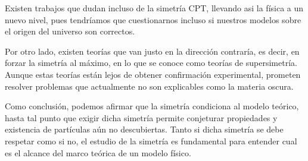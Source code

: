 Existen trabajos que dudan incluso de la simetría CPT, llevando asi la física a un nuevo nivel, pues tendríamos que cuestionarnos incluso si nuestros modelos sobre el origen del universo son correctos.

Por otro lado, existen teorías que van justo en la dirección contraría, es decir, en forzar la simetría al máximo, en lo que se conoce como teorías de supersimetría.
Aunque estas teorías están lejos de obtener confirmación experimental, prometen resolver problemas que actualmente no son explicables como la materia oscura.

Como conclusión, podemos afirmar que la simetría condiciona al modelo teórico, hasta tal punto que exigir dicha simetría permite conjeturar propiedades y existencia de partículas aún no descubiertas.
Tanto si dicha simetría se debe respetar como si no, el estudio de la simetría es fundamental para entender cual es el alcance del marco teórica de un modelo físico.